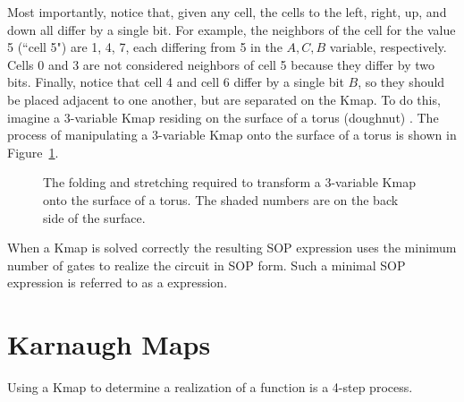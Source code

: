 Most importantly, notice that, given any cell, the cells
to the left, right, up, and down all differ by a single
bit.  For example, the neighbors of the cell for the 
value 5 (``cell 5") are 1, 4, 7, 
each differing from 5 in the $A,C,B$ variable, respectively.
Cells 0 and 3 are not considered neighbors of cell 5 because 
they differ by two bits.  Finally, notice that cell 4 and cell 6 
differ by a single bit $B$, so they should be placed adjacent
to one another, but are separated on the Kmap.  To do this,  
imagine a 3-variable Kmap residing on the surface of a 
torus (doughnut) .  The process of manipulating a 
3-variable Kmap onto the surface of a torus is shown in 
Figure~\ref{fig:minimizationTorus}.

\begin{figure}[ht]
\caption{The folding and stretching required to transform
a 3-variable Kmap onto the surface of a torus.  The shaded
numbers are on the back side of the surface.}
\label{fig:minimizationTorus}
\end{figure}

When a Kmap is solved correctly the resulting SOP expression
uses the minimum number of gates to realize the circuit 
in SOP form.  Such a minimal SOP expression is referred 
to as a \SOPmin {} expression.

\section{Karnaugh Maps}
Using a Kmap to determine a \SOPmin realization of a function
is a 4-step process. 

